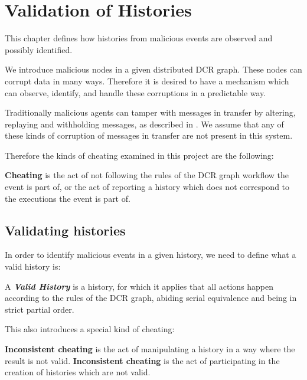 \chapter{Validation of Histories}
\label{chap:consensusindcr}
	This chapter defines how histories from malicious events are observed and possibly identified.
	
	\newpar We introduce malicious nodes in a given distributed DCR graph. These nodes can corrupt data in many ways. Therefore it is desired to have a mechanism which can observe, identify, and handle these corruptions in a predictable way. 
	
	Traditionally malicious agents can tamper with messages in transfer by altering, replaying and withholding messages, as described in \cite{Coulouris:2011:DSC:2029110:chapter2}. We assume that any of these kinds of corruption of messages in transfer are not present in this system. 
	
	\newpar Therefore the kinds of cheating examined in this project are the following:
	\begin{definition}
		\textbf{Cheating} is the act of not following the rules of the DCR graph workflow the event is part of, or the act of reporting a history which does not correspond to the executions the event is part of.
	\end{definition}
	
	\section{Validating histories}
	In order to identify malicious events in a given history, we need to define what a valid history is:
	
		\begin{definition}
			A \textit{\textbf{Valid History}} is a history, for which it applies that all actions happen according to the rules of the DCR graph, abiding serial equivalence and being in strict partial order. 
		\end{definition}
		
	This also introduces a special kind of cheating:
	
		\begin{definition}
			\textbf{Inconsistent cheating} is the act of manipulating a history in a way where the result is not valid.
			\textbf{Inconsistent cheating} is the act of participating in the creation of histories which are not valid.
		\end{definition}
		
